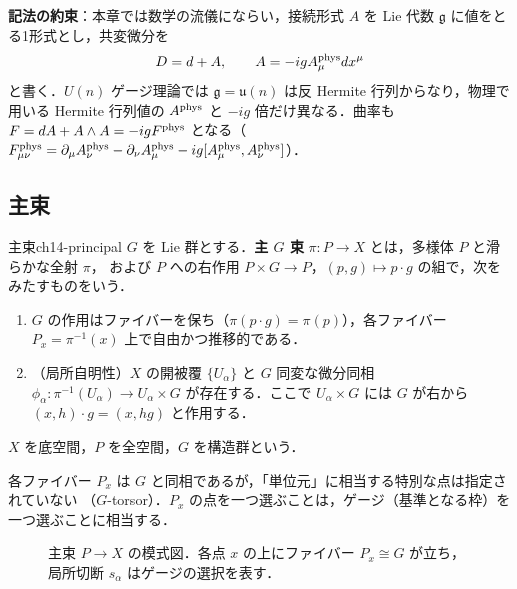 \textbf{記法の約束}：本章では数学の流儀にならい，接続形式 $A$ を Lie 代数 $\mathfrak{g}$ に値をとる1形式とし，共変微分を
\begin{equation}
  D = d + A,\qquad A = -i g A^{\rm phys}_\mu dx^\mu
  \label{eq:ch14-convention}
\end{equation}
と書く．$U(n)$ ゲージ理論では $\mathfrak{g}=\mathfrak{u}(n)$ は反 Hermite 行列からなり，物理で用いる Hermite 行列値の $A^{\rm phys}$ と
$-ig$ 倍だけ異なる．曲率も $F = dA + A\wedge A = -ig F^{\rm phys}$ となる（$F^{\rm phys}_{\mu\nu}=\partial_\mu A^{\rm phys}_\nu-\partial_\nu A^{\rm phys}_\mu - ig[A^{\rm phys}_\mu,A^{\rm phys}_\nu]$）．

\subsection{主束}

\begin{mydef}{主束}{ch14-principal}
$G$ を Lie 群とする．\textbf{主 $G$ 束} $\pi:P\to X$ とは，多様体 $P$ と滑らかな全射 $\pi$，
および $P$ への右作用 $P\times G\to P$，$(p,g)\mapsto p\cdot g$ の組で，次をみたすものをいう．
\begin{enumerate}
  \item $G$ の作用はファイバーを保ち（$\pi(p\cdot g)=\pi(p)$），各ファイバー $P_x=\pi^{-1}(x)$ 上で自由かつ推移的である．
  \item （局所自明性）$X$ の開被覆 $\{U_\alpha\}$ と $G$ 同変な微分同相 $\phi_\alpha:\pi^{-1}(U_\alpha)\to U_\alpha\times G$ が存在する．ここで $U_\alpha\times G$ には $G$ が右から $(x,h)\cdot g=(x,hg)$ と作用する．
\end{enumerate}
$X$ を底空間，$P$ を全空間，$G$ を構造群という．
\end{mydef}

各ファイバー $P_x$ は $G$ と同相であるが，「単位元」に相当する特別な点は指定されていない
（$G$-torsor）．$P_x$ の点を一つ選ぶことは，ゲージ（基準となる枠）を一つ選ぶことに相当する．

\begin{figure}[ht]
\centering
{}
\caption{主束 $P\to X$ の模式図．各点 $x$ の上にファイバー $P_x\cong G$ が立ち，局所切断 $s_\alpha$ はゲージの選択を表す．}
\label{fig:ch14-bundle}
\end{figure}

